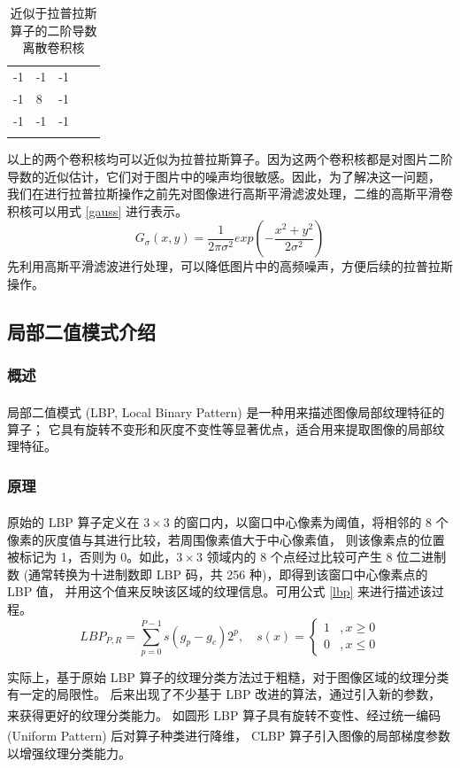 \documentclass[12pt, a4paper, oneside]{ctexbook}
\begin{document}
	\begin{table}[h]
		\centering
		\begin{tabular}{lllll}
			\cline{1-3}
			\multicolumn{1}{|l|}{-1} & \multicolumn{1}{l|}{-1} & \multicolumn{1}{l|}{-1} &  &  \\ \cline{1-3}
			\multicolumn{1}{|l|}{-1} & \multicolumn{1}{l|}{8}  & \multicolumn{1}{l|}{-1} &  &  \\ \cline{1-3}
			\multicolumn{1}{|l|}{-1} & \multicolumn{1}{l|}{-1} & \multicolumn{1}{l|}{-1} &  &  \\ \cline{1-3}
			&                         &                         &  & 
		\end{tabular}
		\caption{近似于拉普拉斯算子的二阶导数离散卷积核}
	\end{table}
	以上的两个卷积核均可以近似为拉普拉斯算子。因为这两个卷积核都是对图片二阶导数的近似估计，它们对于图片中的噪声均很敏感。因此，为了解决这一问题，
	我们在进行拉普拉斯操作之前先对图像进行高斯平滑滤波处理，二维的高斯平滑卷积核可以用式 \ref{gauss} 进行表示。
	\begin{equation}	\label{gauss}
		G_\sigma (x,y)=\frac{1}{2\pi \sigma ^2} exp(-\frac{x^2+y^2}{2\sigma ^2}) 
	\end{equation}
	先利用高斯平滑滤波进行处理，可以降低图片中的高频噪声，方便后续的拉普拉斯操作。
	
	\subsection{局部二值模式介绍}
	\subsubsection{概述}
	局部二值模式 (LBP, Local Binary Pattern)\textsuperscript{\cite{8}}\textsuperscript{\cite{9}}\textsuperscript{\cite{13}} 是一种用来描述图像局部纹理特征的算子；
	它具有旋转不变形和灰度不变性等显著优点，适合用来提取图像的局部纹理特征。	
	\subsubsection{原理}
	原始的 LBP 算子\textsuperscript{\cite{13}}定义在 $3\times3$ 的窗口内，以窗口中心像素为阈值，将相邻的 8 个像素的灰度值与其进行比较，若周围像素值大于中心像素值，
	则该像素点的位置被标记为 1，否则为 0。如此，$3\times3$ 领域内的 8 个点经过比较可产生 8 位二进制数 (通常转换为十进制数即 LBP 码，共 256 种)，即得到该窗口中心像素点的 LBP 值，
	并用这个值来反映该区域的纹理信息。可用公式 \ref{lbp} 来进行描述该过程。
	\begin{equation}
		LBP_{P,R}=\sum_{p=0}^{P-1}s(g_p-g_c)2^{p},\quad s(x)=\begin{cases}
			1  &,x\geq0\\
			0  &,x\le0 
		\end{cases}
		\label{lbp}
	\end{equation}
	\par
	实际上，基于原始 LBP 算子的纹理分类方法过于粗糙，对于图像区域的纹理分类有一定的局限性。
	后来出现了不少基于 LBP 改进的算法，通过引入新的参数，来获得更好的纹理分类能力。
	如圆形 LBP 算子\textsuperscript{\cite{8}}具有旋转不变性、经过统一编码 (Uniform Pattern) 后对算子种类进行降维，
	CLBP 算子\textsuperscript{\cite{9}}引入图像的局部梯度参数以增强纹理分类能力。
\end{document}
